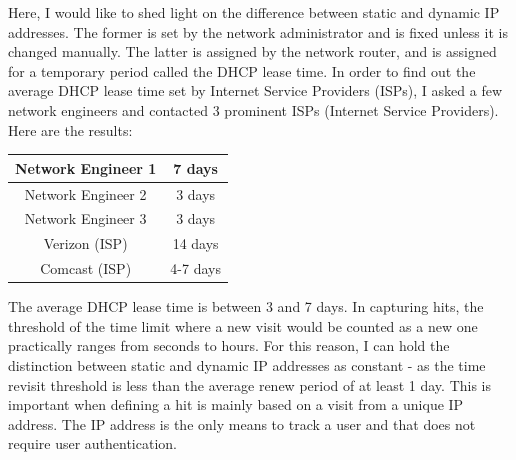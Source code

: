 \documentclass[12pt]{article}
\begin{document}
Here, I would like to shed light on the difference between static and dynamic IP addresses. The former is set by the network administrator and is fixed unless it is changed manually. The latter is assigned by the network router, and is assigned for a temporary period called the DHCP lease time. In order to find out the average DHCP lease time set by Internet Service Providers (ISPs), I asked a few network engineers and contacted 3 prominent ISPs (Internet Service Providers). Here are the results:
\vspace{0.3in}

\begin{tabular}{| c | c |}
  \hline                       
  Network Engineer 1 & 7 days \\[1ex] \hline
  Network Engineer 2 & 3 days \\[1ex] \hline
  Network Engineer 3 & 3 days \\ [1ex] \hline
  Verizon (ISP) & 14 days \\[1ex] \hline
  Comcast (ISP) & 4-7 days \\[1ex]
  \hline  
\end{tabular}
\vspace{0.3in}

The average DHCP lease time is between 3 and 7 days. In capturing hits, the threshold of the time limit where a new visit would be counted as a new one practically ranges from seconds to hours. For this reason, I can hold the distinction between static and dynamic IP addresses as constant - as the time revisit threshold is less than the average renew period of at least 1 day. This is important when defining a hit is mainly based on a visit from a unique IP address. The IP address is the only means to track a user and that does not require user authentication. 
\end{document}
